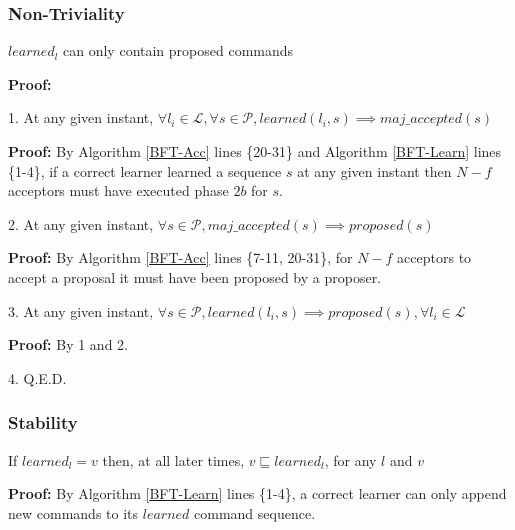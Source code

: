 \subsubsection{Non-Triviality}
\begin{Theorem}
$learned_l$ can only contain proposed commands \label{N-T1} \par
\end{Theorem} 
\textbf{Proof:} \par
\parbox{\linewidth}{\strut1. At any given instant, $\forall l_i \in \mathcal{L}, \forall s \in \mathcal{P}, learned(l_i,s) \implies maj\_accepted(s)$ }\par
\indent\indent\parbox{\linewidth}{\strut\textbf{Proof:} By Algorithm \ref{BFT-Acc} lines \{20-31\} and Algorithm \ref{BFT-Learn} lines \{1-4\}, if a correct learner learned a sequence $s$ at any given instant then $N-f$ acceptors must have executed phase $2b$ for $s$.}\par
\parbox{\linewidth}{\strut2. At any given instant, $\forall s \in \mathcal{P}, maj\_accepted(s) \implies proposed(s)$ }\par
\indent\indent\parbox{\linewidth}{\strut\textbf{Proof:} By Algorithm \ref{BFT-Acc} lines \{7-11, 20-31\}, for $N-f$ acceptors to accept a proposal it must have been proposed by a proposer.}\par
\parbox{\linewidth}{\strut3. At any given instant, $\forall s \in \mathcal{P}, learned(l_i,s) \implies proposed(s),\forall l_i \in \mathcal{L}$}\par
\indent\indent\parbox{\linewidth}{\strut\textbf{Proof:} By 1 and 2.}\par
\parbox{\linewidth}{\strut4. Q.E.D.}\par

\subsubsection{Stability}
\begin{Theorem}
If $learned_l = v$ then, at all later times, $v \sqsubseteq learned_l$, for any $l$ and $v$ \par \label{S-T1}
\end{Theorem} 
\textbf{Proof:} By Algorithm \ref{BFT-Learn} lines \{1-4\}, a correct learner can only append new commands to its $learned$ command sequence.

